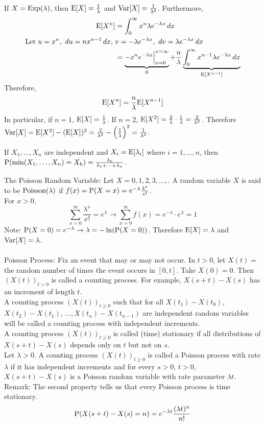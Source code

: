 \documentclass[12pt]{article}
\begin{document}
If $X = \text{Exp}( \lambda )$, then $\mathrm{E}[ X ] = \frac{1}{\lambda}$ and $\mathrm{Var}[ X ] = \frac{1}{\lambda^2}$. Furthermore, $$ \begin{aligned} \mathrm{E}[ X^n ] &= \int_0^\infty x^n \lambda e^{-\lambda x} \, dx \\ \text{Let } u = x^n, ~ du = nx^{n-1}\, dx, ~& v = -\lambda e^{-\lambda x}, ~ dv = \lambda e^{-\lambda x} \, dx \\ &= \underbrace{-x^n e^{-\lambda x} \Big|_{x = 0}^{x = \infty}}_0 + \frac{n}{\lambda} \underbrace{\int_0^\infty x^{n-1} \lambda e^{-\lambda x} \, dx}_{\mathrm{E}[ X^{n-1} ]} \end{aligned} $$ 
Therefore, $$\mathrm{E}[ X^n ] = \frac{n}{\lambda}\mathrm{E}[ X^{n-1} ] $$ 
In particular, if $n=1$, $\mathrm{E}[ X ] = \frac{1}{\lambda}$. If $n = 2$, $\mathrm{E}[ X^2 ] = \frac{2}{\lambda} \cdot \frac{1}{\lambda} = \frac{2}{\lambda^2}$. Therefore $\mathrm{Var}[ X ] = \mathrm{E}[ X^2 ] - (\mathrm{E}[ X ])^2 = \frac{2}{\lambda^2} - \Big( \frac{1}{\lambda}\Big)^2 = \frac{1}{\lambda^2}$. 

\begin{theorem} If $X_1,\dots,X_n$ are independent and $X_i = \mathrm{E}[ \lambda_i ]$ where $i = 1,\dots, n$, then $\mathrm{P}( \min( X_1,\dots, X_n) = X_k ) = \frac{\lambda_k}{\lambda_1 + \dots + \lambda_n} $. \end{theorem} 
The Poisson Random Variable: Let $X = 0,1,2,3,\dots,$. A random variable $X$ is said to be $\text{Poisson}( \lambda )$ if $f(x) = \mathrm{P}( X = x ) = e^{-\lambda} \frac{\lambda^x}{x!}$. \\
For $x > 0$, $$\sum_{x=0}^\infty \frac{\lambda^x}{x!} = e^\lambda \to \sum_{x=0}^\infty f(x) = e^{-\lambda} \cdot e^{\lambda} = 1$$ 
Note: $\mathrm{P}( X = 0 ) = e^{-\lambda} \to \lambda = -\ln(\mathrm{P}( X= 0 ))$. Therefore $\mathrm{E}[ X ] = \lambda$ and $\mathrm{Var}[ X ] = \lambda$. \\~\\
Poisson Process: Fix an event that may or may not occur. In $t > 0$, let $X(t) = $ the random number of times the event occurs in $[0,t]$. Take $X(0) = 0$. Then $(X(t))_{t >0}$ is called a counting process. For example, $X(s+t) - X(s)$ has an increment of length $t$. \\
A counting process $(X(t))_{t \geq 0}$ such that for all $X(t_1) - X(t_0)$, $X(t_2) - X(t_1)$, $\dots, X(t_n) - X(t_{n-1})$ are independent random variables will be called a counting process with independent increments. \\
A counting process $(X(t))_{t \geq 0}$ is called (time) stationary if all distributions of $X(s+t) - X(s)$ depends only on $t$ but not on $s$. \\
Let $\lambda > 0$. A counting process $(X(t))_{t \geq 0}$ is called a Poisson process with rate $\lambda$ if it has independent increments and for every $s >0$, $t>0$, $X(s+t) - X(s)$ is a Poisson random variable with rate parameter $\lambda t$. \\
Remark: The second property tells us that every Poisson process is time stationary. 
$$ \mathrm{P}( X(s+t) - X(s) = n ) = e^{-\lambda t} \frac{(\lambda t)^n}{n!} $$ 
\end{document}
